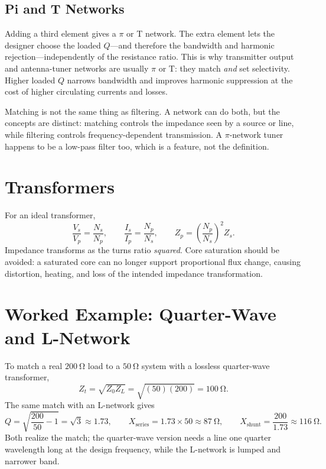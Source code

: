 \subsection{Pi and T Networks}
Adding a third element gives a \(\pi\) or T network. The extra element lets the
designer choose the loaded \(Q\)---and therefore the bandwidth and harmonic
rejection---independently of the resistance ratio. This is why transmitter output
and antenna-tuner networks are usually \(\pi\) or T: they match \emph{and} set
selectivity. Higher loaded \(Q\) narrows bandwidth and improves harmonic
suppression at the cost of higher circulating currents and losses.

\begin{mistakebox}
Matching is not the same thing as filtering. A network can do both, but the
concepts are distinct: matching controls the impedance seen by a source or line,
while filtering controls frequency-dependent transmission. A \(\pi\)-network tuner
happens to be a low-pass filter too, which is a feature, not the definition.
\end{mistakebox}

\section{Transformers}
For an ideal transformer,
\[
\frac{V_s}{V_p}=\frac{N_s}{N_p},
\qquad
\frac{I_s}{I_p}=\frac{N_p}{N_s},
\qquad
Z_p=\left(\frac{N_p}{N_s}\right)^2 Z_s.
\]
Impedance transforms as the turns ratio \emph{squared}. Core saturation should be
avoided: a saturated core can no longer support proportional flux change, causing
distortion, heating, and loss of the intended impedance transformation.

\section{Worked Example: Quarter-Wave and L-Network}
To match a real \(\SI{200}{\ohm}\) load to a \(\SI{50}{\ohm}\) system with a
lossless quarter-wave transformer,
\[
Z_t=\sqrt{Z_0Z_L}=\sqrt{(50)(200)}=\SI{100}{\ohm}.
\]
The same match with an L-network gives
\[
Q=\sqrt{\frac{200}{50}-1}=\sqrt{3}\approx1.73,
\qquad
X_{\text{series}}=1.73\times50\approx\SI{87}{\ohm},
\qquad
X_{\text{shunt}}=\frac{200}{1.73}\approx\SI{116}{\ohm}.
\]
Both realize the match; the quarter-wave version needs a line one quarter
wavelength long at the design frequency, while the L-network is lumped and
narrower band.
